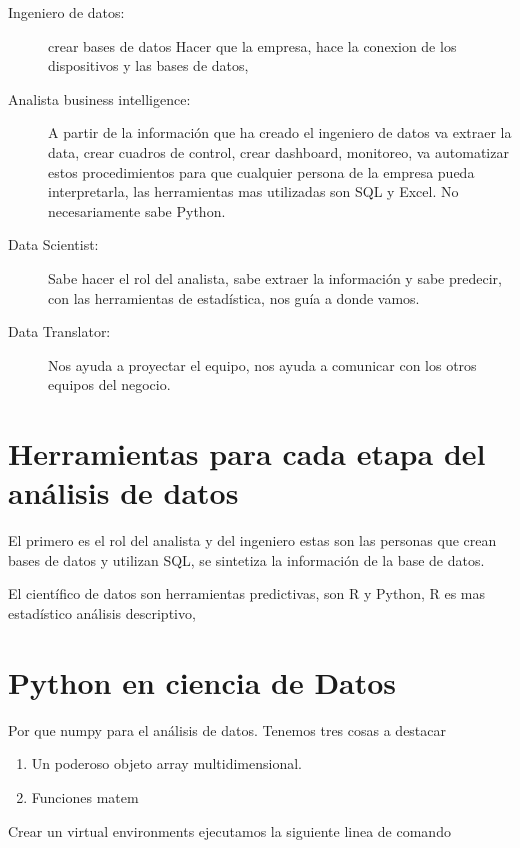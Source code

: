 \begin{description}
	\item[Ingeniero de datos: ] crear bases de datos  Hacer que la empresa, hace la conexion de los dispositivos y las bases de datos,

	\item[Analista business intelligence: ] A partir de la informaci\'on que ha creado el ingeniero de datos va extraer la data, crear cuadros de control, crear dashboard, monitoreo, va automatizar estos procedimientos para que cualquier persona de la empresa pueda interpretarla, las herramientas mas utilizadas son SQL y Excel. No necesariamente sabe Python.

	\item[Data Scientist: ] Sabe hacer el rol del analista, sabe extraer la informaci\'on y sabe predecir, con las herramientas de estad\'istica, nos gu\'ia a donde vamos.

	\item[Data Translator: ] Nos ayuda a proyectar el equipo, nos ayuda a comunicar con los otros equipos del negocio.


\end{description}

\section{Herramientas para cada etapa del an\'alisis de datos}

El primero es el rol del analista y del ingeniero estas son las personas que crean bases de datos y utilizan SQL, se sintetiza la informaci\'on de la base de datos.

El cient\'ifico de datos son herramientas predictivas, son R y Python, R es mas estad\'istico an\'alisis descriptivo,

\section{Python en ciencia de Datos}

Por que numpy para el análisis de datos. Tenemos tres cosas a destacar
\begin{enumerate}
	\item Un poderoso objeto array multidimensional.
	\item Funciones matem
\end{enumerate}

Crear un virtual environments ejecutamos la siguiente linea de comando

